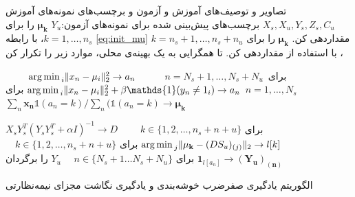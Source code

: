 	\begin{enumerate}[label={\arabic*},itemsep=.1em, parsep=.1em]
 تصاویر و توصیف‌های آموزش و آزمون و برچسب‌های نمونه‌های آموزش $X_s, X_u, Y_s, Z_s, C_u$
 برچسب‌های پیش‌بینی شده برای نمونه‌های آزمون:$Y_u$
  $\boldsymbol{\mu_k}$ را برای  $k=1,\ldots,n_s$،  با رابطه \eqref{eq:init_mu} مقداردهی کن.
  $\boldsymbol{\mu_k}$ را برای $k=n_s+1,\ldots,n_s+n_u$، با استفاده از  مقداردهی کن.
 تا همگرایی به یک بهینه‌ی محلی، موارد زیر را تکرار کن

$\qquad$
${\operatorname*{arg\,min\,}_i \lVert x_n - \mu_i \rVert_2^2} \rightarrow a_n \, $
برای
$\, n = N_s + 1, \ldots, N_s+N_u \,$
 $\qquad$
${\argmin_i \lVert x_n - \mu_i \rVert_2^2} + \beta \mathds{1}(y_n \neq 1_i) \rightarrow a_n \, $
برای
 $n = 1, \ldots, N_s \quad$
 $\qquad$ $\sum_{n} \mathbf{x_n} \mathds{1}(a_n = k) / \sum_n (\mathds{1}(a_n = k) \rightarrow \mathbf{\mu_k}$

 $X_s Y_s^T (Y_s Y_s^T + \alpha I)^{-1} \rightarrow D\quad$
 برای
 $\quad k \in \{1,2,\ldots, n_s + n+u\}$
 $\operatorname*{arg\,min\,}_j \lVert \mathbf{\mu_k} - (DS_u)_{(j)} \rVert_2 \rightarrow l[k] \quad$
 برای
 $\quad k \in \{1,2,\ldots, n_s + n+u\}$
   $ \mathbf{1}_{l[a_n]} \rightarrow \mathbf{(Y_u)_{(n)}}  \quad$
   برای
   $\quad n \in \{ N_s +1 \ldots N_s + N_u \}$
 $Y_u$ را برگردان
\end{enumerate}
\caption{الگوریتم یادگیری صفرضرب خوشه‌بندی و یادگیری نگاشت مجزای نیمه‌نظارتی}
\label{alg:simple}


